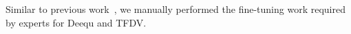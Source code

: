 Similar to previous work~\cite{redyuk2021automating}, we manually performed the fine-tuning work required by experts for Deequ and TFDV.




